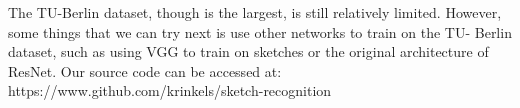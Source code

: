 \documentclass[10pt,twocolumn,letterpaper]{article}
\begin{document}
The TU-Berlin dataset, though is the largest, is still relatively limited. However, some things that we can try next is use other networks to train on the TU- Berlin dataset, such as using VGG to train on sketches or the original architecture of ResNet. Our source code can be accessed at: https://www.github.com/krinkels/sketch-recognition


{\small


}
\end{document}
